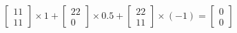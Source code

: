 \documentclass[preview]{standalone}
\begin{document}
\begin{align*}
\begin{bmatrix} 11 \\ 11 \end{bmatrix} 
            \times 1 + 
            \begin{bmatrix} 22 \\ 0 \end{bmatrix} 
            \times 0.5 + 
            \begin{bmatrix} 22 \\ 11 \end{bmatrix} 
            \times (-1) = 
            \begin{bmatrix} 0 \\ 0 \end{bmatrix}
\end{align*}
\end{document}
